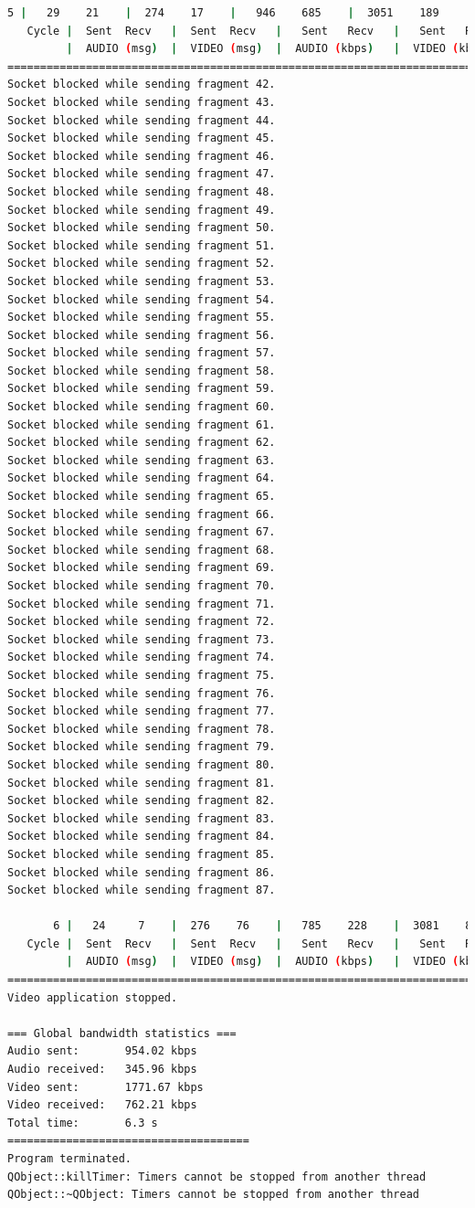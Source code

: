 \begin{lstlisting}[language=bash,basicstyle=\ttfamily\tiny]
       5 |   29    21    |  274    17    |   946    685    |  3051    189    |  27     76       
   Cycle |  Sent  Recv   |  Sent  Recv   |   Sent   Recv   |   Sent   Recv   | Program System
         |  AUDIO (msg)  |  VIDEO (msg)  |  AUDIO (kbps)   |  VIDEO (kbps)   |     CPU (%) 
===========================================================================================
Socket blocked while sending fragment 42.
Socket blocked while sending fragment 43.
Socket blocked while sending fragment 44.
Socket blocked while sending fragment 45.
Socket blocked while sending fragment 46.
Socket blocked while sending fragment 47.
Socket blocked while sending fragment 48.
Socket blocked while sending fragment 49.
Socket blocked while sending fragment 50.
Socket blocked while sending fragment 51.
Socket blocked while sending fragment 52.
Socket blocked while sending fragment 53.
Socket blocked while sending fragment 54.
Socket blocked while sending fragment 55.
Socket blocked while sending fragment 56.
Socket blocked while sending fragment 57.
Socket blocked while sending fragment 58.
Socket blocked while sending fragment 59.
Socket blocked while sending fragment 60.
Socket blocked while sending fragment 61.
Socket blocked while sending fragment 62.
Socket blocked while sending fragment 63.
Socket blocked while sending fragment 64.
Socket blocked while sending fragment 65.
Socket blocked while sending fragment 66.
Socket blocked while sending fragment 67.
Socket blocked while sending fragment 68.
Socket blocked while sending fragment 69.
Socket blocked while sending fragment 70.
Socket blocked while sending fragment 71.
Socket blocked while sending fragment 72.
Socket blocked while sending fragment 73.
Socket blocked while sending fragment 74.
Socket blocked while sending fragment 75.
Socket blocked while sending fragment 76.
Socket blocked while sending fragment 77.
Socket blocked while sending fragment 78.
Socket blocked while sending fragment 79.
Socket blocked while sending fragment 80.
Socket blocked while sending fragment 81.
Socket blocked while sending fragment 82.
Socket blocked while sending fragment 83.
Socket blocked while sending fragment 84.
Socket blocked while sending fragment 85.
Socket blocked while sending fragment 86.
Socket blocked while sending fragment 87.

       6 |   24     7    |  276    76    |   785    228    |  3081    847    |  24     66       
   Cycle |  Sent  Recv   |  Sent  Recv   |   Sent   Recv   |   Sent   Recv   | Program System
         |  AUDIO (msg)  |  VIDEO (msg)  |  AUDIO (kbps)   |  VIDEO (kbps)   |     CPU (%) 
===========================================================================================
Video application stopped.

=== Global bandwidth statistics ===
Audio sent:       954.02 kbps
Audio received:   345.96 kbps
Video sent:       1771.67 kbps
Video received:   762.21 kbps
Total time:       6.3 s
=====================================
Program terminated.
QObject::killTimer: Timers cannot be stopped from another thread
QObject::~QObject: Timers cannot be stopped from another thread
\end{lstlisting}
\vspace{\baselineskip}

